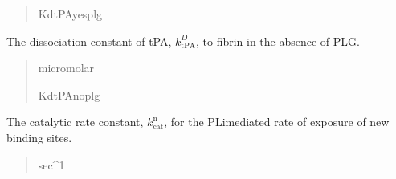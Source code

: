 \documentclass[letterpaper,10pt,english]{sphinxmanual}
\begin{document}
\begin{fulllineitems}
\begin{fulllineitems}
\begin{quote}
\begin{description}
\sphinxAtStartPar
KdtPAyesplg

\end{description}\end{quote}

\end{fulllineitems}


\begin{fulllineitems}
\label{\detokenize{lysis.util:lysis.util.parameters.MicroParameters.diss_const_tPA_woPLG}}
\pysigstartsignatures
{}
\pysigstopsignatures
\sphinxAtStartPar
The dissociation constant of tPA, \(k^D_\text{tPA}\), to fibrin
in the absence of PLG.
\begin{quote}\begin{description}
\sphinxAtStartPar
micromolar

\sphinxAtStartPar
KdtPAnoplg

\end{description}\end{quote}

\end{fulllineitems}


\begin{fulllineitems}
\label{\detokenize{lysis.util:lysis.util.parameters.MicroParameters.exposure_rate_binding_site}}
\pysigstartsignatures
{}
\pysigstopsignatures
\sphinxAtStartPar
The catalytic rate constant, \(k_\text{cat}^\text{n}\),
for the PLi\sphinxhyphen{}mediated rate of exposure of new binding sites.
\begin{quote}\begin{description}
\sphinxAtStartPar
sec\textasciicircum{}\sphinxhyphen{}1


\end{description}
\end{quote}
\end{fulllineitems}
\end{fulllineitems}
\end{document}
